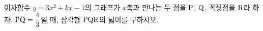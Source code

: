 이차함수 $y=3x^2+kx-1$의 그래프가 $x$축과 만나는 두 점을 $\mathrm{P}$, $\mathrm{Q}$, 꼭짓점을 $\mathrm{R}$라 하자. $\overline{\mathrm{PQ}}=\dfrac{4}{3}$일 때, 삼각형 $\mathrm{PQR}$의 넓이를 구하시오. 
